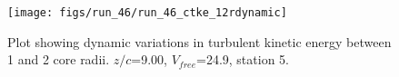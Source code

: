 \begin{figure}[H]
\centering
\texttt{[image: figs/run\_46/run\_46\_ctke\_12rdynamic]}
\caption{Plot showing dynamic variations in turbulent kinetic energy between 1 and 2 core radii. $z/c$=9.00, $V_{free}$=24.9, station 5.}
\end{figure}


